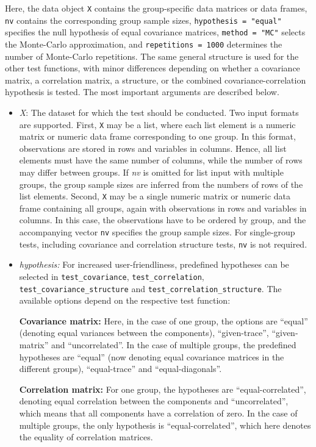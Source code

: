 Here, the data object \texttt{X} contains the group-specific data matrices or data
frames, \texttt{nv} contains the corresponding group sample sizes,
\texttt{hypothesis\ =\ "equal"} specifies the null hypothesis of equal covariance
matrices, \texttt{method\ =\ "MC"} selects the Monte-Carlo approximation, and
\texttt{repetitions\ =\ 1000} determines the number of Monte-Carlo repetitions. The same
general structure is used for the other test functions, with minor differences
depending on whether a covariance matrix, a correlation matrix, a structure, or
the combined covariance-correlation hypothesis is tested. The most important
arguments are described below.

\begin{itemize}
\item
  \emph{X}: The dataset for which the test should be conducted. Two input
  formats are supported. First, \texttt{X} may be a list, where each list element is
  a numeric matrix or numeric data frame corresponding to one group. In this
  format, observations are stored in rows and variables in columns. Hence,
  all list elements must have the same number of columns, while the number of
  rows may differ between groups. If \emph{nv} is omitted for list input with
  multiple groups, the group sample sizes are inferred from the numbers of
  rows of the list elements. Second, \texttt{X} may be a single numeric matrix or
  numeric data frame containing all groups, again with observations in rows
  and variables in columns. In this case, the observations have to be ordered
  by group, and the accompanying vector \texttt{nv} specifies the group sample sizes.
  For single-group tests, including covariance and correlation structure
  tests, \texttt{nv} is not required.
\item
  \emph{hypothesis:} For increased user-friendliness, predefined hypotheses can be selected in
  \texttt{test\_covariance}, \texttt{test\_correlation}, \texttt{test\_covariance\_structure} and
  \texttt{test\_correlation\_structure}. The available options depend on the
  respective test function:

  \textbf{Covariance matrix:} Here, in the case of one group,
  the options are ``equal'' (denoting equal variances between the components),
  ``given-trace'', ``given-matrix'' and ``uncorrelated''.
  In the case of multiple groups, the predefined hypotheses are
  ``equal'' (now denoting equal covariance matrices in the different
  groups), ``equal-trace'' and ``equal-diagonals''.

  \textbf{Correlation matrix:} For one group, the hypotheses
  are ``equal-correlated'', denoting equal correlation between the
  components and ``uncorrelated'', which means that all components
  have a correlation of zero. In the case of multiple groups, the
  only hypothesis is ``equal-correlated'', which here denotes the
  equality of correlation matrices.


\end{itemize}
